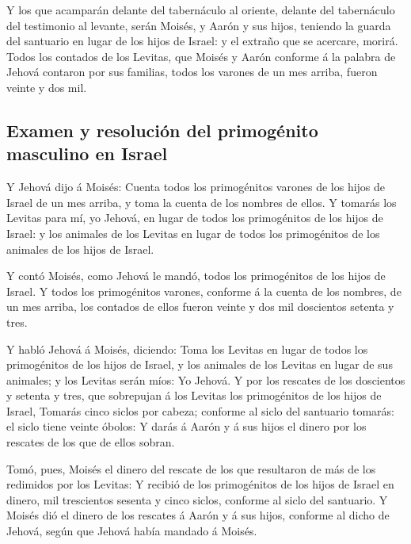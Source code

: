  Y los que acamparán delante del tabernáculo al oriente,
delante del tabernáculo del testimonio al levante, serán Moisés, y Aarón
y sus hijos, teniendo la guarda del santuario en lugar de los hijos de
Israel: y el extraño que se acercare, morirá.  Todos los
contados de los Levitas, que Moisés y Aarón conforme á la palabra de
Jehová contaron por sus familias, todos los varones de un mes arriba,
fueron veinte y dos mil.

\hypertarget{examen-y-resoluciuxf3n-del-primoguxe9nito-masculino-en-israel}{%
\subsection{Examen y resolución del primogénito masculino en
Israel}\label{examen-y-resoluciuxf3n-del-primoguxe9nito-masculino-en-israel}}

 Y Jehová dijo á Moisés: Cuenta todos los primogénitos
varones de los hijos de Israel de un mes arriba, y toma la cuenta de los
nombres de ellos.  Y tomarás los Levitas para mí, yo
Jehová, en lugar de todos los primogénitos de los hijos de Israel: y los
animales de los Levitas en lugar de todos los primogénitos de los
animales de los hijos de Israel.

 Y contó Moisés, como Jehová le mandó, todos los
primogénitos de los hijos de Israel.  Y todos los
primogénitos varones, conforme á la cuenta de los nombres, de un mes
arriba, los contados de ellos fueron veinte y dos mil doscientos setenta
y tres.

 Y habló Jehová á Moisés, diciendo:  Toma los
Levitas en lugar de todos los primogénitos de los hijos de Israel, y los
animales de los Levitas en lugar de sus animales; y los Levitas serán
míos: Yo Jehová.  Y por los rescates de los doscientos y
setenta y tres, que sobrepujan á los Levitas los primogénitos de los
hijos de Israel,  Tomarás cinco siclos por cabeza; conforme
al siclo del santuario tomarás: el siclo tiene veinte óbolos:
 Y darás á Aarón y á sus hijos el dinero por los rescates
de los que de ellos sobran.

 Tomó, pues, Moisés el dinero del rescate de los que
resultaron de más de los redimidos por los Levitas:  Y
recibió de los primogénitos de los hijos de Israel en dinero, mil
trescientos sesenta y cinco siclos, conforme al siclo del santuario.
 Y Moisés dió el dinero de los rescates á Aarón y á sus
hijos, conforme al dicho de Jehová, según que Jehová había mandado á
Moisés.

